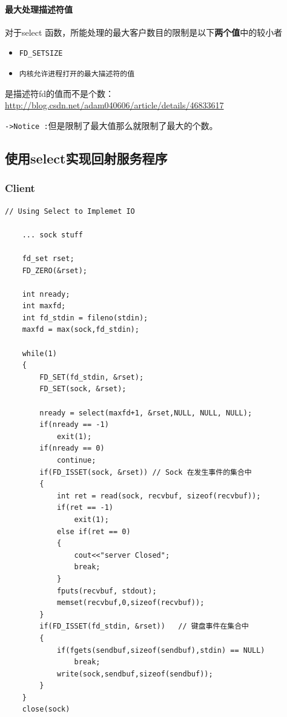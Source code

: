 \documentclass[UTF8,a4paper,12pt]{ctexbook}
\begin{document}
			\paragraph{最大处理描述符值}
				对于select 函数，所能处理的最大客户数目的限制是以下\textbf{两个值}中的较小者
					\begin{itemize}
						\item \verb|FD_SETSIZE|
						\item \verb|内核允许进程打开的最大描述符的值|
					\end{itemize}	
					
				是描述符fd的值而不是个数：\url{http://blog.csdn.net/adam040606/article/details/46833617}
				
				\verb|->Notice :|但是限制了最大值那么就限制了最大的个数。
		\subsection{使用select实现回射服务程序}
			\subsubsection{Client}
				\begin{lstlisting}
// Using Select to Implemet IO
	
	... sock stuff
	
	fd_set rset;
	FD_ZERO(&rset);
	
	int nready;
	int maxfd;
	int fd_stdin = fileno(stdin);
	maxfd = max(sock,fd_stdin);
	
	while(1)
	{
		FD_SET(fd_stdin, &rset);
		FD_SET(sock, &rset);
		
		nready = select(maxfd+1, &rset,NULL, NULL, NULL);
		if(nready == -1)
			exit(1);
		if(nready == 0)
			continue;
		if(FD_ISSET(sock, &rset)) // Sock 在发生事件的集合中
		{
			int ret = read(sock, recvbuf, sizeof(recvbuf));
			if(ret == -1)
				exit(1);
			else if(ret == 0)
			{
				cout<<"server Closed";
				break;
			}
			fputs(recvbuf, stdout);
			memset(recvbuf,0,sizeof(recvbuf));
		}
		if(FD_ISSET(fd_stdin, &rset))	// 键盘事件在集合中
		{
			if(fgets(sendbuf,sizeof(sendbuf),stdin) == NULL)
				break;
			write(sock,sendbuf,sizeof(sendbuf));
		}
	}
	close(sock)

				\end{lstlisting}
\end{document}
